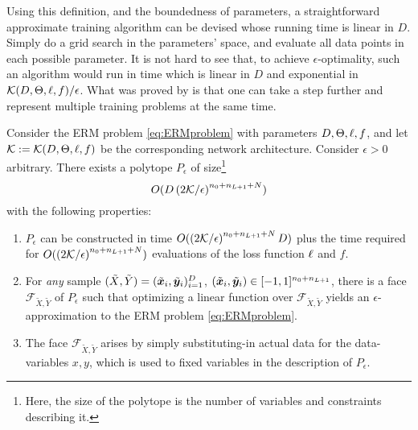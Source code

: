 Using this definition, and the boundedness of parameters, a straightforward approximate training algorithm can be devised whose running time is linear in $D$. Simply do a grid search in the parameters' space, and evaluate all data points in each possible parameter. It is not hard to see that, to achieve $\epsilon$-optimality, such an algorithm would run in time which is linear in $D$ and exponential in $ \mathcal{K}(D,\Theta,\ell, f) / \epsilon$.
%
What was proved by \cite{TrainingLP} is that one can take a step further and represent multiple training problems at the same time.

\begin{theorem}\label{theorem:bienstocketal}
  Consider the ERM problem \eqref{eq:ERMproblem} with parameters $D, \Theta, \ell, f$, and let $\mathcal{K}:= \mathcal{K}(D,\Theta,\ell, f)$ be the corresponding network architecture. Consider $\epsilon > 0$ arbitrary. There exists a polytope $P_{\epsilon}$ of size\footnote{Here, the size of the polytope is the number of variables and constraints describing it.}
  \[O(D \left(2\mathcal{K}/\epsilon\right)^{{n_0}+{n_{L+1}}+N}) \]
  with the following properties:
  \begin{enumerate}
      \item $P_{\epsilon}$ can be constructed in time $O(\left(2\mathcal{K}/\epsilon\right)^{{n_0}+{n_{L+1}}+N} D)$ plus the time required for $O(\left(2\mathcal{K}/\epsilon\right)^{{n_0}+{n_{L+1}}+N})$ evaluations of the loss function $\ell$ and $f$.
      \item For \emph{any} sample $(\tilde{X}, \tilde{Y}) = (\tilde{{\bm{x}}}_i, \tilde{{\bm{y}}}_i)_{i=1}^D$, $(\tilde{{\bm{x}}}_i,\tilde{{\bm{y}}}_i) \in [-1,1]^{{n_0}+{n_{L+1}}}$, there is a face $\mathcal{F}_{\tilde{X},\tilde{Y}}$ of $P_{\epsilon}$ such that optimizing a linear function over $\mathcal{F}_{\tilde{X},\tilde{Y}}$ yields an $\epsilon$-approximation to the ERM problem \eqref{eq:ERMproblem}.
      \item  The face $\mathcal{F}_{\tilde{X},\tilde{Y}}$ arises by simply substituting-in actual data for the data-variables $x,y$, which is used to fixed variables in the description of $P_{\epsilon}$.
  \end{enumerate}
\end{theorem}

